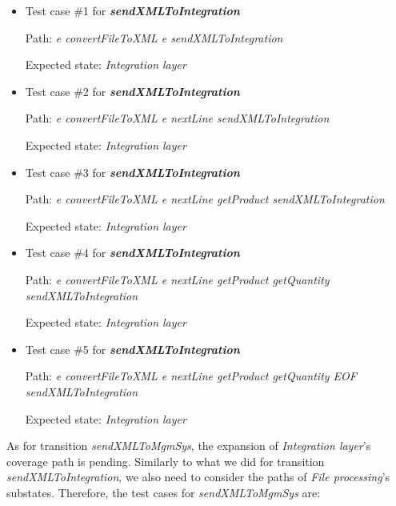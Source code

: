 \begin{itemize}

\item Test case \#1 for \textit{\textbf{sendXMLToIntegration}}

Path: \textit{e convertFileToXML e sendXMLToIntegration}

Expected state: \textit{Integration layer}

\item Test case \#2 for \textit{\textbf{sendXMLToIntegration}}

Path: \textit{e convertFileToXML e  nextLine sendXMLToIntegration}

Expected state: \textit{Integration layer}


\item Test case \#3 for \textit{\textbf{sendXMLToIntegration}}

Path: \textit{e convertFileToXML e  nextLine  getProduct sendXMLToIntegration}

Expected state: \textit{Integration layer}

\item Test case \#4 for \textit{\textbf{sendXMLToIntegration}}

Path: \textit{e convertFileToXML e  nextLine  getProduct  getQuantity sendXMLToIntegration}

Expected state: \textit{Integration layer}

\item Test case \#5 for \textit{\textbf{sendXMLToIntegration}}

Path: \textit{e convertFileToXML e  nextLine  getProduct  getQuantity EOF sendXMLToIntegration}

Expected state: \textit{Integration layer}

\end{itemize}

As for transition \textit{sendXMLToMgmSys}, the expansion of \textit{Integration layer}'s coverage path is pending. Similarly to what we did for transition \textit{sendXMLToIntegration}, we also need to consider the paths of \textit{File processing}'s substates. Therefore, the test cases for \textit{sendXMLToMgmSys} are:

